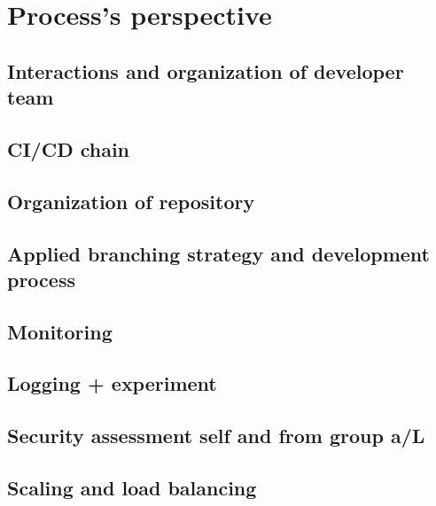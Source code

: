 \section{Process's perspective} \label{section:Process perspective}
\subsection{Interactions and organization of developer team}
\subsection{CI/CD chain}
\subsection{Organization of repository}
\subsection{Applied branching strategy and development process}
\subsection{Monitoring}
\subsection{Logging + experiment}
\subsection{Security assessment self and from group a/L}
\subsection{Scaling and load balancing}
